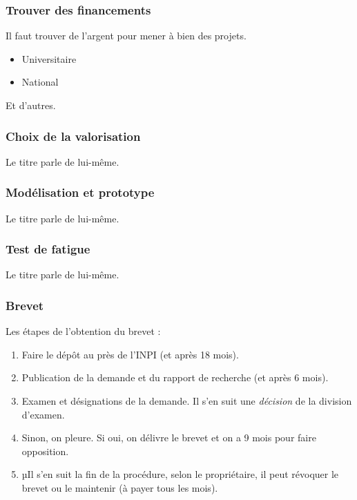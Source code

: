 \documentclass[a4paper,11pt]{article}
\begin{document}
\begin{sloppypar}
\subsubsection{Trouver des financements}
Il faut trouver de l'argent pour mener à bien des projets.
\begin{itemize}
 \item Universitaire
\item National 
\end{itemize}
Et d'autres.

\subsubsection{Choix de la valorisation}
Le titre parle de lui-même.
\subsubsection{Modélisation et prototype}
Le titre parle de lui-même.
\subsubsection{Test de fatigue}
Le titre parle de lui-même.
\subsubsection{Brevet}
Les étapes de l'obtention du brevet :
\begin{enumerate}
 \item Faire le dépôt au près de l'INPI (et après 18 mois).
\item Publication de la demande et du rapport de recherche (et après 6 mois).
\item Examen et désignations de la demande. Il s'en suit une \emph{décision} de la division d'examen.
\item Sinon, on pleure. Si oui, on délivre le brevet et on a 9 mois pour faire opposition.
\item µIl s'en suit la fin de la procédure, selon le propriétaire, il peut révoquer le brevet ou le maintenir (à payer tous les mois). 
\end{enumerate}


\end{sloppypar}
\end{document}

